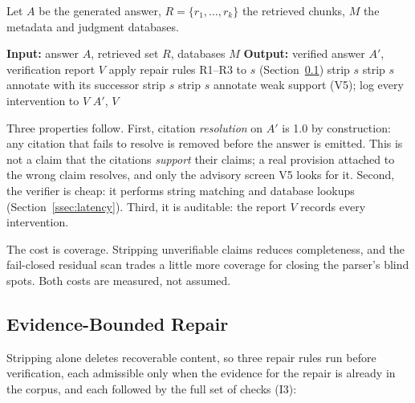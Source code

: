\documentclass[conference]{IEEEtran}
\begin{document}
Let $A$ be the generated answer, $R = \{r_1, \dots, r_k\}$ the retrieved chunks, $M$ the metadata and judgment databases.

\begin{algorithmic}[1]
\STATE \textbf{Input:} answer $A$, retrieved set $R$, databases $M$
\STATE \textbf{Output:} verified answer $A'$, verification report $V$
    \STATE apply repair rules R1--R3 to $s$ (Section~\ref{ssec:repair})
        \STATE strip $s$
    \ENDIF
            \STATE strip $s$
            \STATE annotate with its successor
        \ENDIF
    \ENDFOR
        \STATE strip $s$
    \ENDIF
            \STATE strip $s$
        \ENDIF
    \ENDFOR
    \STATE annotate weak support (V5); log every intervention to $V$
\ENDFOR
\RETURN $A'$, $V$
\end{algorithmic}

Three properties follow. First, citation \emph{resolution} on $A'$ is 1.0 by construction: any citation that fails to resolve is removed before the answer is emitted. This is not a claim that the citations \emph{support} their claims; a real provision attached to the wrong claim resolves, and only the advisory screen V5 looks for it. Second, the verifier is cheap: it performs string matching and database lookups (Section~\ref{ssec:latency}). Third, it is auditable: the report $V$ records every intervention.

The cost is coverage. Stripping unverifiable claims reduces completeness, and the fail-closed residual scan trades a little more coverage for closing the parser's blind spots. Both costs are measured, not assumed.

\subsection{Evidence-Bounded Repair}
\label{ssec:repair}

Stripping alone deletes recoverable content, so three repair rules run before verification, each admissible only when the evidence for the repair is already in the corpus, and each followed by the full set of checks (I3):
\end{document}
